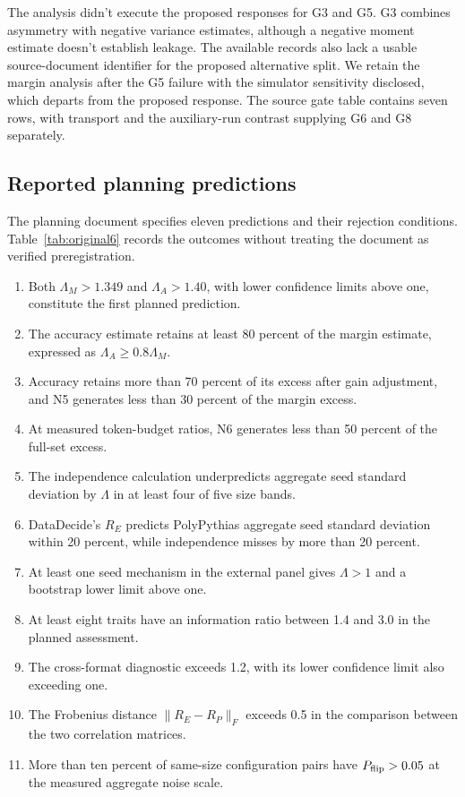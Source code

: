 The analysis didn't execute the proposed responses for G3 and G5. G3 combines asymmetry with negative variance estimates, although a negative moment estimate doesn't establish leakage. The available records also lack a usable source-document identifier for the proposed alternative split. We retain the margin analysis after the G5 failure with the simulator sensitivity disclosed, which departs from the proposed response. The source gate table contains seven rows, with transport and the auxiliary-run contrast supplying G6 and G8 separately.

\subsection{Reported planning predictions}
The planning document specifies eleven predictions and their rejection conditions. Table~\ref{tab:original6} records the outcomes without treating the document as verified preregistration.
\begin{enumerate}
\item Both $\Lambda_M>1.349$ and $\Lambda_A>1.40$, with lower confidence limits above one, constitute the first planned prediction.
\item The accuracy estimate retains at least 80 percent of the margin estimate, expressed as $\Lambda_A\geq0.8\Lambda_M$.
\item Accuracy retains more than 70 percent of its excess after gain adjustment, and N5 generates less than 30 percent of the margin excess.
\item At measured token-budget ratios, N6 generates less than 50 percent of the full-set excess.
\item The independence calculation underpredicts aggregate seed standard deviation by $\Lambda$ in at least four of five size bands.
\item DataDecide's $R_E$ predicts PolyPythias aggregate seed standard deviation within 20 percent, while independence misses by more than 20 percent.
\item At least one seed mechanism in the external panel gives $\Lambda>1$ and a bootstrap lower limit above one.
\item At least eight traits have an information ratio between 1.4 and 3.0 in the planned assessment.
\item The cross-format diagnostic exceeds 1.2, with its lower confidence limit also exceeding one.
\item The Frobenius distance $\|R_E-R_P\|_F$ exceeds 0.5 in the comparison between the two correlation matrices.
\item More than ten percent of same-size configuration pairs have $P_{\rm flip}>0.05$ at the measured aggregate noise scale.
\end{enumerate}

